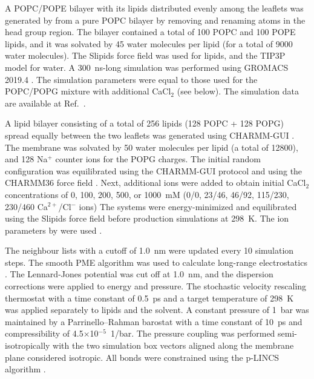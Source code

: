 \documentclass[journal=jpcbfk]{achemso}
\begin{document}
A POPC/POPE bilayer with its lipids distributed evenly among the leaflets was generated by from a pure POPC bilayer by removing and renaming atoms in the head group region. The bilayer contained a total of 100 POPC and 100 POPE lipids, and it was solvated by 45 water molecules per lipid (for a total of 9000 water molecules).
The Slipids force field \cite{jambeck12,jambeck12b,jambeck13} was used for lipids, and the TIP3P model \cite{jorgensen83} for water. A 300~ns-long simulation was performed using GROMACS 2019.4 \cite{abraham2015gromacs}. The simulation parameters were equal to those used for the POPC/POPG mixture with additional CaCl$_2$ (see below). 
The simulation data are available at Ref.~.


A lipid bilayer consisting of a total of 256 lipids (128 POPC + 128 POPG) spread equally between the two leaflets was generated using CHARMM-GUI \cite{lee16}. The membrane was solvated by 50 water molecules per lipid (a total of 12800), and 128 Na$^{+}$ counter ions for the POPG charges. The initial random configuration was equilibrated using the CHARMM-GUI protocol and using the CHARMM36 force field \cite{klauda10}. Next, additional ions were added to obtain initial CaCl$_2$ concentrations of 0, 100, 200, 500, or 1000~mM (0/0, 23/46, 46/92, 115/230, 230/460 Ca$^{2+}$/Cl$^{-}$ ions) The systems were energy-minimized and equilibrated using the Slipids force field \cite{jambeck12,jambeck12b,jambeck13} before production simulations at 298~K. The ion parameters by \citeauthor{dang06} were used \cite{dang06}.

The neighbour lists with a cutoff of 1.0~nm were updated every 10 simulation steps. The smooth PME algorithm was used to calculate long-range electrostatics \cite{darden93,essman95}. The Lennard-Jones potential was cut off at 1.0~nm, and the dispersion corrections \cite{shirts07} were applied to energy and pressure. The stochastic velocity rescaling thermostat \cite{bussi07} with a time constant of 0.5~ps and a target temperature of 298~K was applied separately to lipids and the solvent. A constant pressure of 1~bar was maintained by a Parrinello--Rahman barostat \cite{parrinello81} with a time constant of 10~ps and compressibility of 4.5$\times$10$^{-5}$~1/bar. The pressure coupling was performed semi-isotropically with the two simulation box vectors aligned along the membrane plane considered isotropic. All bonds were constrained using the p-LINCS algorithm \cite{hess97,hess07}.
\end{document}
